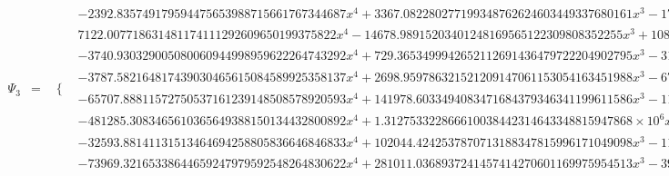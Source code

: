 \documentclass{article}
\begin{document}
\begin{landscape}
\begin{eqnarray*}
\begin{array}{cc}
\end{array}\\
\Psi_3 & = & \begin{array}{cc}
 \{ & 
\begin{array}{cc}
 -2392.835749179594475653988715661767344687 x^4+3367.082280277199348762624603449337680161 x^3-1746.592176757384270165927580038905590305 x^2+393.4472888995997611737018512219872142322 x-32.35669784991422536099737026084270059934 & x\geq \frac{1}{4}\land x<\frac{3}{8} \\
 7122.007718631481174111292609650199375822 x^4-14678.98915203401248169565122309808352255 x^3+10889.12014227408418495087316670611155585 x^2-3477.187858859107859061677624070075305602 x+405.7229895723938074227588394821875312614 & x\geq \frac{3}{8}\land x<\frac{1}{2} \\
 -3740.930329005080060944998959622264743292 x^4+729.3653499942652112691436479722204902795 x^3-31.15173453829956090340172001442790346261 x^2 & x\geq 0\land x<\frac{1}{8} \\
 -3787.582164817439030465615084589925358137 x^4+2698.959786321521209147061153054163451988 x^3-670.6239020596259095144765768493893346206 x^2+67.90777014477551670162114463433413001289 x-2.332193175675260559966786897223980969559 & x\geq \frac{1}{8}\land x<\frac{1}{4} \\
 -65707.88811572750537161239148508578920593 x^4+141978.6033494083471684379346341199611586 x^3-114251.6028810076286518769252879355075426 x^2+40585.28870552032851302777348502600457293 x-5370.665109829754466573985077636703932161 & x\geq \frac{1}{2}\land x<\frac{5}{8} \\
 -481285.3083465610365649388150134432800892 x^4+1.312753322866610038442314643348815947868\times 10^6 x^3-1.339396522914675720273618191353239666243\times 10^6 x^2+605852.1387575580813846129235185334557151 x-102511.8018169289817699235095871008093788 & x\geq \frac{5}{8}\land x<\frac{3}{4} \\
 -32593.88141131513464694258805836646846833 x^4+102044.4242537870713188347815996171049098 x^3-118634.5746632539830219262112483330337210 x^2+60613.69983633677304132858707625443481221 x-11462.52371888318711505992307396303504971 & x\geq \frac{3}{4}\land x<\frac{7}{8} \\
 -73969.32165338644659247979592548264830622 x^4+281011.0368937241457414270601169975954513 x^3-399873.3194383558180879392441101535715060 x^2+252590.8148090849853215164915712449498830 x-59759.21061106686638252451165260632552207 & x\geq \frac{7}{8}\land x<1
\end{array}


\end{array}
\end{eqnarray*}
\end{landscape}
\end{document}
